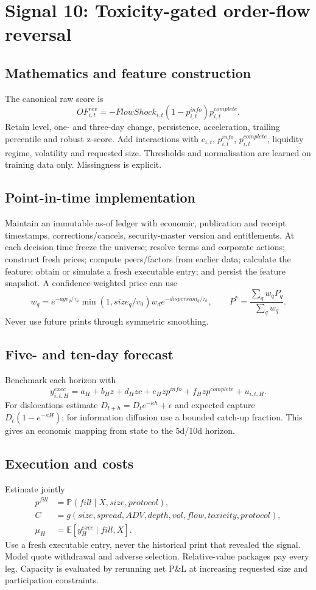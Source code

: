 \documentclass[10pt]{article}
\newcommand{\E}{\mathbb{E}}\newcommand{\Pp}{\mathbb{P}}
\begin{document}
\section{Signal 10: Toxicity-gated order-flow reversal}
\subsection{Mathematics and feature construction}
The canonical raw score is
\begin{equation}OF^{rev}_{i,t}=-FlowShock_{i,t}(1-p^{info}_{i,t})p^{complete}_{i,t}.\end{equation}
Retain level, one- and three-day change, persistence, acceleration, trailing percentile and robust z-score. Add interactions with $c_{i,t}$, $p^{info}_{i,t}$, $p^{complete}_{i,t}$, liquidity regime, volatility and requested size. Thresholds and normalisation are learned on training data only. Missingness is explicit.

\subsection{Point-in-time implementation}
Maintain an immutable as-of ledger with economic, publication and receipt timestamps, corrections/cancels, security-master version and entitlements. At each decision time freeze the universe; resolve terms and corporate actions; construct fresh prices; compute peers/factors from earlier data; calculate the feature; obtain or simulate a fresh executable entry; and persist the feature snapshot. A confidence-weighted price can use
\[w_q=e^{-age_q/\tau_a}\min(1,size_q/v_0)w_d e^{-dispersion_q/\tau_\sigma},\qquad P^*=\frac{\sum_qw_qP_q}{\sum_qw_q}.\]
Never use future prints through symmetric smoothing.

\subsection{Five- and ten-day forecast}
Benchmark each horizon with
\[y^{exec}_{i,t,H}=a_H+b_Hz+d_Hzc+e_Hzp^{info}+f_Hzp^{complete}+u_{i,t,H}.\]
For dislocations estimate $D_{t+h}=D_te^{-\kappa h}+\epsilon$ and expected capture $D_t(1-e^{-\kappa H})$; for information diffusion use a bounded catch-up fraction. This gives an economic mapping from state to the 5d/10d horizon.

\subsection{Execution and costs}
Estimate jointly
\begin{align}
p^{fill}&=\Pp(fill\mid X,size,protocol),\\
C&=g(size,spread,ADV,depth,vol,flow,toxicity,protocol),\\
\mu_H&=\E[y^{exec}_H\mid fill,X].
\end{align}
Use a fresh executable entry, never the historical print that revealed the signal. Model quote withdrawal and adverse selection. Relative-value packages pay every leg. Capacity is evaluated by rerunning net P\&L at increasing requested size and participation constraints.
\end{document}
